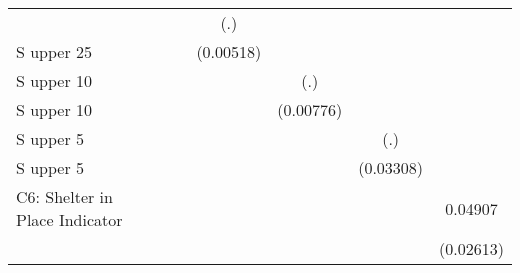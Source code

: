 \begin{table}[htbp]
\begin{tabular}{l*{6}{c}}
                    &                     &                     &         (.)         &                     &                     &                     \\
\addlinespace
S upper 25%
                    &                     &                     &   (0.00518)         &                     &                     &                     \\
\addlinespace
S upper 10%
                    &                     &                     &                     &         (.)         &                     &                     \\
\addlinespace
S upper 10%
                    &                     &                     &                     &   (0.00776)         &                     &                     \\
\addlinespace
S upper 5%
                    &                     &                     &                     &                     &         (.)         &                     \\
\addlinespace
S upper 5%
                    &                     &                     &                     &                     &   (0.03308)         &                     \\
\addlinespace
C6: Shelter in Place Indicator&                     &                     &                     &                     &                     &     0.04907\sym{*}  \\
                    &                     &                     &                     &                     &                     &   (0.02613)         \\

\end{tabular}
\end{table}
